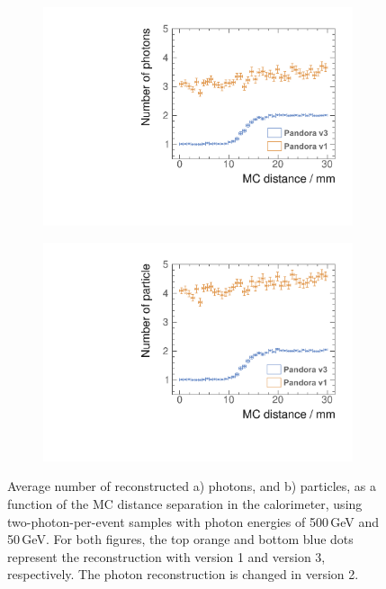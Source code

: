 \begin{figure}[tbph]
\centering
    \begin{subfigure}[b]{0.45\textwidth}
        \includegraphics[width=\textwidth]{photon/DoubleCompareN_p3edit.pdf}
        \caption{}
        \label{fig:photonDoubleCompareN_p}
    \end{subfigure}
    \begin{subfigure}[b]{0.45\textwidth}
        \includegraphics[width=\textwidth]{photon/DoubleCompareN_all2edit.pdf}
        \caption{}
        \label{fig:photonDoubleCompareN_all}
    \end{subfigure}
\caption[Average number of reconstructed photons and reconstructed particles, as a function of the MC distance separation.]
{Average number of reconstructed a) photons, and b) particles, as a function of the MC distance separation in the calorimeter, using  two-photon-per-event samples with photon energies of  500\,GeV and 50\,GeV. For both figures, the top orange and bottom blue dots represent the reconstruction with \pandora version 1 and version 3, respectively. The photon reconstruction is changed in \pandora version 2.}
\label{fig:photonDoubleCompareN}
\end{figure}





